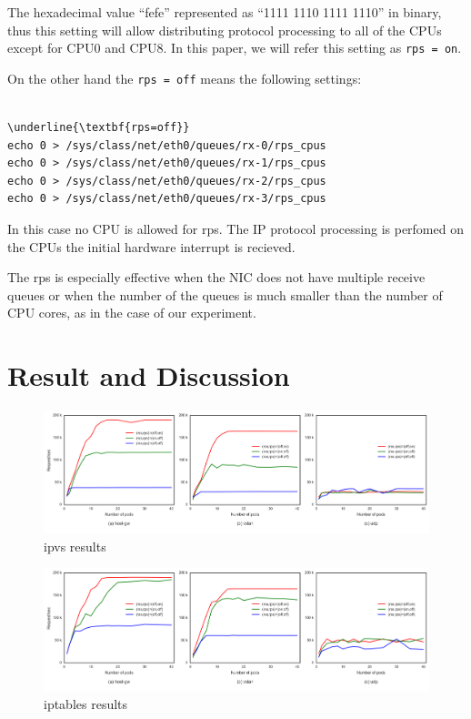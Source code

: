 The hexadecimal value \enquote{fefe} represented as \enquote{1111 1110 1111 1110} in binary, 
thus this setting will allow distributing protocol processing to all of the CPUs except for CPU0 and CPU8.
In this paper, we will refer this setting as {\tt rps = on}.

On the other hand the {\tt rps = off} means the following settings:

\begin{center}
\begin{minipage}{0.8\columnwidth}
\begin{Verbatim}[commandchars=\\\{\}]

\underline{\textbf{rps=off}}
echo 0 > /sys/class/net/eth0/queues/rx-0/rps_cpus
echo 0 > /sys/class/net/eth0/queues/rx-1/rps_cpus
echo 0 > /sys/class/net/eth0/queues/rx-2/rps_cpus
echo 0 > /sys/class/net/eth0/queues/rx-3/rps_cpus

\end{Verbatim}
\end{minipage}
\end{center}

In this case no CPU is allowed for rps. 
The IP protocol processing is perfomed on the CPUs the initial hardware interrupt is recieved.

The rps is especially effective when the NIC does not have multiple receive queues or when the number of the queues is 
much smaller than the number of CPU cores, as in the case of our experiment.


\section{Result and Discussion}\label{Result and Discussion}

\begin{figure}
\includegraphics[width=\columnwidth]{Figs/ipvs_3figs}
\caption{ipvs results}
\label{fig:ipvs3figs}
\end{figure}

\begin{figure}
\includegraphics[width=\columnwidth]{Figs/iptables_3figs}
\caption{iptables results}
\label{fig:iptabls3figs}
\end{figure}

